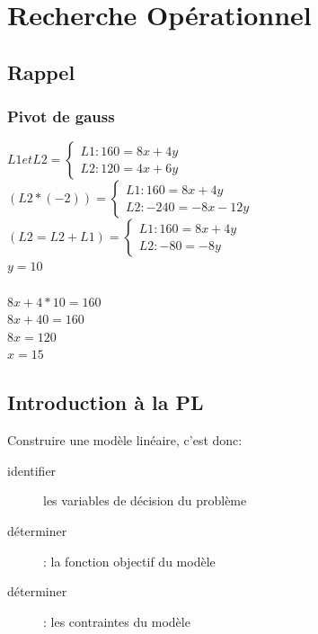 \part{Recherche Opérationnel}
\pagebreak

\chapter{Rappel}
\section{Pivot de gauss}

$ L1 et L2 =
\begin{cases}
L1: 160 = 8x + 4y\\
L2: 120 = 4x + 6y 
\end{cases}$
\\
$( L2*(-2) )=
\begin{cases}
L1: 160 = 8x + 4y\\
L2: -240 = -8x -12y
\end{cases}$
\\
$( L2=L2+L1 )=
\begin{cases}
L1: 160 = 8x + 4y\\
L2: -80 = -8y
\end{cases}$
\\
$y = 10$
\\\\
$8x + 4*10 = 160$\\
$8x + 40 = 160$\\
$8x = 120$\\
$x = 15$\\

\chapter{Introduction à la PL}

Construire une modèle linéaire, c'est donc:
\begin{description}
\item[identifier] les variables de décision du problème
\item[déterminer]: la fonction objectif du modèle
\item[déterminer]: les contraintes du modèle 
\end{description}

